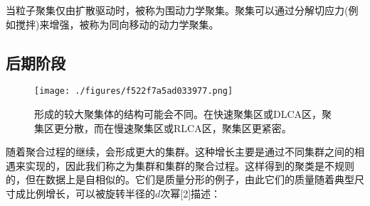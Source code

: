当粒子聚集仅由扩散驱动时，被称为围动力学聚集。聚集可以通过分解切应力(例如搅拌)来增强，被称为同向移动的动力学聚集。

\subsection{后期阶段}
\begin{figure}[ht]
\centering
\texttt{[image: ./figures/f522f7a5ad033977.png]}
\caption{形成的较大聚集体的结构可能会不同。在快速聚集区或DLCA区，聚集区更分散，而在慢速聚集区或RLCA区，聚集区更紧密。} \label{fig_LZJH_2}
\end{figure}
随着聚合过程的继续，会形成更大的集群。这种增长主要是通过不同集群之间的相遇来实现的，因此我们称之为集群和集群的聚合过程。这样得到的聚类是不规则的，但在数据上是自相似的。它们是质量分形的例子，由此它们的质量随着典型尺寸成比例增长，可以被旋转半径的$d$次幂[2]描述：
